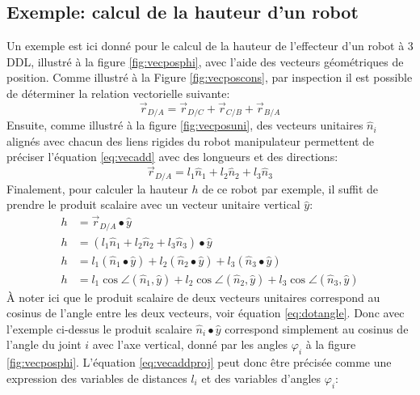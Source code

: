 \subsection{Exemple: calcul de la hauteur d'un robot}
\label{sec:hauteurrobot}
%
Un exemple est ici donné pour le calcul de la hauteur de l'effecteur d'un robot à 3 DDL, illustré à la figure \ref{fig:vecposphi}, avec l'aide des vecteurs géométriques de position. Comme illustré à la Figure \ref{fig:vecposcons}, par inspection il est possible de déterminer la relation vectorielle suivante:
\begin{equation}
\vec{r}_{D/A} = \vec{r}_{D/C} + \vec{r}_{C/B} + \vec{r}_{B/A}
\label{eq:vecadd}
\end{equation} 
Ensuite, comme illustré à la figure \ref{fig:vecposuni}, des vecteurs unitaires $\hat{n}_i$ alignés avec chacun des liens rigides du robot manipulateur permettent de préciser l'équation \eqref{eq:vecadd} avec des longueurs et des directions:
\begin{equation}
\vec{r}_{D/A} = l_1 \hat{n}_{1} + l_2 \hat{n}_{2} + l_3 \hat{n}_{3}
\label{eq:vecadduni}
\end{equation} 
Finalement, pour calculer la hauteur $h$ de ce robot par exemple, il suffit de prendre le produit scalaire avec un vecteur unitaire vertical $\hat{y}$:
\begin{align}
h &= \vec{r}_{D/A} \bullet \hat{y} \\
h &= ( l_1 \hat{n}_{1} + l_2 \hat{n}_{2} + l_3 \hat{n}_{3} ) \bullet \hat{y} \\
h &= l_1 ( \hat{n}_{1} \bullet \hat{y} ) + l_2 ( \hat{n}_{2} \bullet \hat{y} ) + l_3 ( \hat{n}_{3}  \bullet \hat{y} ) \\
h &= l_1 \cos \angle (\hat{n}_{1},\hat{y}) + l_2 \cos \angle (\hat{n}_{2},\hat{y}) + l_3 \cos \angle (\hat{n}_{3},\hat{y})
\label{eq:vecaddproj}
\end{align} 
À noter ici que le produit scalaire de deux vecteurs unitaires correspond au cosinus de l'angle entre les deux vecteurs, voir équation \eqref{eq:dotangle}. Donc avec l’exemple ci-dessus le produit scalaire $\hat{n}_{i} \bullet \hat{y}$ correspond simplement au cosinus de l'angle du joint $i$ avec l'axe vertical, donné par les angles $\varphi_i$ à la figure \ref{fig:vecposphi}. L'équation \eqref{eq:vecaddproj} peut donc être précisée comme une expression des variables de distances $l_i$ et des variables d'angles $\varphi_i$: 
